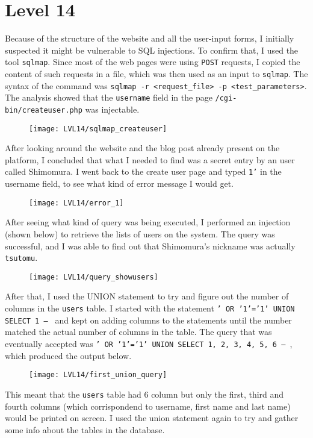 \documentclass[12pt,a4paper]{article}
\begin{document}
	\section*{Level 14}
	Because of the structure of the website and all the user-input forms, I initially suspected it might be vulnerable to SQL injections. To confirm that, I used the tool \texttt{sqlmap}. Since most of the web pages were using \texttt{POST} requests, I copied the content of such requests in a file, which was then used as an input to \texttt{sqlmap}. The syntax of the command was \texttt{sqlmap -r <request\_file> -p <test\_parameters>}. The analysis showed that the \texttt{username} field in the page \texttt{/cgi-bin/createuser.php} was injectable.
	\begin{figure}[H]
		\centering
		\texttt{[image: LVL14/sqlmap\_createuser]}
		\label{fig:sqlmap}
	\end{figure}
	After looking around the website and the blog post already present on the platform, I concluded that what I needed to find was a secret entry by an user called Shimomura. I went back to the create user page and typed \texttt{1'} in the username field, to see what kind of error message I would get.
	\begin{figure}[H]
		\centering
		\texttt{[image: LVL14/error\_1]}
		\label{fig:error1}
	\end{figure}
	After seeing what kind of query was being executed, I performed an injection (shown below) to retrieve the lists of users on the system. The query was successful, and I was able to find out that Shimomura's nickname was actually \texttt{tsutomu}. 
	\begin{figure}[H]
	\centering
	\texttt{[image: LVL14/query\_showusers]}
	\label{fig:showusers}
	\end{figure}
	After that, I used the UNION statement to try and figure out the number of columns in the \texttt{users} table. I started with the statement \texttt{' OR '1'='1' UNION SELECT 1 -- } and kept on adding columns to the statements until the number matched the actual number of columns in the table. The query that was eventually accepted was \texttt{' OR '1'='1' UNION SELECT 1, 2, 3, 4, 5, 6 -- }, which produced the output below.
	\begin{figure}[H]
	\centering
	\texttt{[image: LVL14/first\_union\_query]}
	\label{fig:firstunion}
	\end{figure}
	This meant that the \texttt{users} table had 6 column but only the first, third and fourth columns (which corrispondend to username, first name and last name) would be printed on screen. I used the union statement again to try and gather some info about the tables in the database. 
\end{document}
